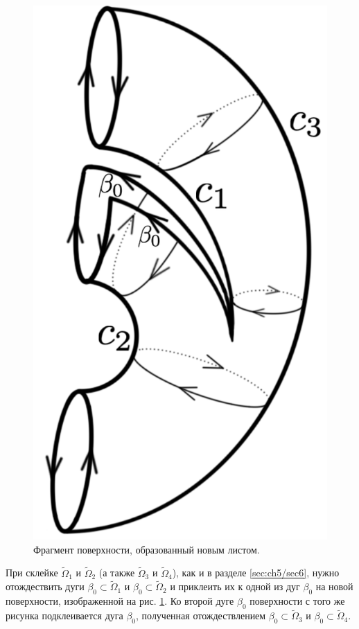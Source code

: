\begin{figure}[!htb]
\endminipage\hfill
{}
\centering
\includegraphics[scale=0.11]{images/ch4/section3_circular/atoms/II/bifurcation/special_surface_1.pdf}
    \caption{Фрагмент поверхности, образованный новым листом.}
        \label{fig:pt10:_II_special_surface_1}
\endminipage\hfill
\end{figure}
 
 При склейке $\widetilde{\Omega}_1$ и $\widetilde{\Omega}_2$ (а также $\widetilde{\Omega}_3$ и $\widetilde{\Omega}_4$),  как и в разделе \ref{sec:ch5/sec6}, нужно отождествить дуги $\beta_0 \subset \widetilde{\Omega}_1$  и $\beta_0 \subset \widetilde{\Omega}_2$ и приклеить их к одной из дуг $\beta_0$ на новой поверхности, изображенной на рис.  \ref{fig:pt10:_II_special_surface_1}.
Ко второй дуге $\beta_0$ поверхности с того же рисунка подклеивается дуга $\beta_0$, полученная отождествлением $\beta_0 \subset \widetilde{\Omega}_3$  и $\beta_0 \subset \widetilde{\Omega}_4$.

